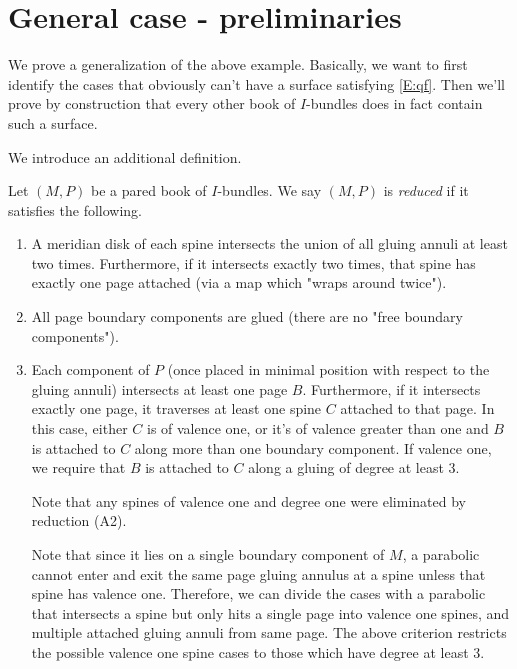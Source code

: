 \section{General case - preliminaries}

We prove a generalization of the above example. Basically, we want to first
identify the cases that obviously can't have a surface satisfying \eqref{E:qf}.
Then we'll prove by construction that every other book of $I$-bundles does in
fact contain such a surface.

We introduce an additional definition.

\begin{defn}

Let $(M,P)$ be a pared book of $I$-bundles. We say $(M,P)$ is \emph{reduced} if
it satisfies the following.

\begin{enumerate}

\item A meridian disk of each spine intersects the union of all gluing annuli
at least two times. Furthermore, if it intersects exactly two times, that spine
has exactly one page attached (via a map which "wraps around twice").

\item All page boundary components are glued (there are no "free boundary
components").

\item Each component of $P$ (once placed in minimal position with respect to
the gluing annuli) intersects at least one page $B$. Furthermore, if it
intersects exactly one page, it traverses at least one spine $C$ attached to
that page. In this case, either $C$ is of valence one, or it's of valence
greater than one and $B$ is attached to $C$ along more than one boundary
component.  If valence one, we require that $B$ is attached to $C$ along
a gluing of degree at least 3.

Note that any spines of valence one and degree one were eliminated by reduction
(A2).

Note that since it lies on a single boundary component of $M$, a parabolic
cannot enter and exit the same page gluing annulus at a spine unless that spine
has valence one. Therefore, we can divide the cases with a parabolic that
intersects a spine but only hits a single page into valence one spines, and
multiple attached gluing annuli from same page. The above criterion restricts
the possible valence one spine cases to those which have degree at least 3.

\end{enumerate}

\end{defn}

